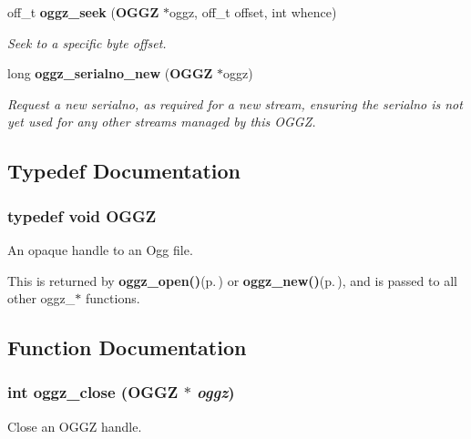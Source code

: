 \begin{CompactItemize}
off\_\-t {\bf oggz\_\-seek} ({\bf OGGZ} $\ast$oggz, off\_\-t offset, int whence)
\begin{CompactList}\small\item\em Seek to a specific byte offset. \item\end{CompactList}\item 
long {\bf oggz\_\-serialno\_\-new} ({\bf OGGZ} $\ast$oggz)
\begin{CompactList}\small\item\em Request a new serialno, as required for a new stream, ensuring the serialno is not yet used for any other streams managed by this OGGZ. \item\end{CompactList}\end{CompactItemize}


\subsection{Typedef Documentation}
\subsubsection{\setlength{\rightskip}{0pt plus 5cm}typedef void {\bf OGGZ}}\label{oggz_8h_a0}


An opaque handle to an Ogg file. 

This is returned by {\bf oggz\_\-open()}{\rm (p.\,\pageref{oggz_8h_a5})} or {\bf oggz\_\-new()}{\rm (p.\,\pageref{oggz_8h_a4})}, and is passed to all other oggz\_\-$\ast$ functions. 

\subsection{Function Documentation}
\subsubsection{\setlength{\rightskip}{0pt plus 5cm}int oggz\_\-close ({\bf OGGZ} $\ast$ {\em oggz})}\label{oggz_8h_a8}


Close an OGGZ handle. 

